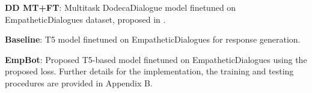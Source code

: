 \documentclass[11pt]{article}
\begin{document}
\noindent \textbf{DD MT+FT}: Multitask DodecaDialogue model finetuned on EmpatheticDialogues dataset, proposed in \cite{shuster_2019_dodeca_dialogues}.

\noindent \textbf{Baseline}: T5 model finetuned on EmpatheticDialogues for response generation.

\noindent \textbf{EmpBot}: Proposed T5-based model finetuned on EmpatheticDialogues using the proposed loss. Further details for the implementation, the training and testing procedures are provided in Appendix B.

\end{document}
